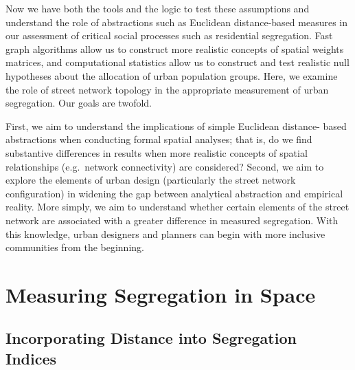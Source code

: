 \documentclass[
  10pt,
]{article}
\begin{document}
Now we have both the tools and the logic to test these assumptions and
understand the role of abstractions such as Euclidean distance-based
measures in our assessment of critical social processes such as
residential segregation. Fast graph algorithms allow us to construct
more realistic concepts of spatial weights matrices, and computational
statistics allow us to construct and test realistic null hypotheses
about the allocation of urban population groups. Here, we examine the
role of street network topology in the appropriate measurement of urban
segregation. Our goals are twofold.

First, we aim to understand the implications of simple Euclidean
distance- based abstractions when conducting formal spatial analyses;
that is, do we find substantive differences in results when more
realistic concepts of spatial relationships (e.g.~network connectivity)
are considered? Second, we aim to explore the elements of urban design
(particularly the street network configuration) in widening the gap
between analytical abstraction and empirical reality. More simply, we
aim to understand whether certain elements of the street network are
associated with a greater difference in measured segregation. With this
knowledge, urban designers and planners can begin with more inclusive
communities from the beginning.

\hypertarget{measuring-segregation-in-space}{%
\section{Measuring Segregation in
Space}\label{measuring-segregation-in-space}}

\hypertarget{incorporating-distance-into-segregation-indices}{%
\subsection{Incorporating Distance into Segregation
Indices}\label{incorporating-distance-into-segregation-indices}}
\end{document}
